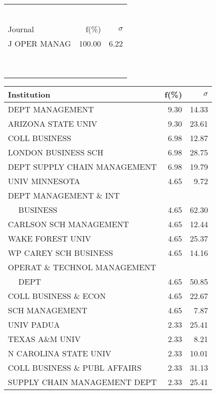\documentclass[a4paper,11pt]{report}
\begin{document}
\begin{landscape}
\begin{table}[!ht]
{\begin{tabular}{|l r  r|}
 &  & \\
 &  & \\
 &  & \\
 &  & \\
 &  & \\
 &  & \\
\hline
\hline
Journal & f(\%) & $\sigma$\\
\hline
J OPER MANAG & 100.00 & 6.22\\
 &  & \\
 &  & \\
 &  & \\
 &  & \\
 &  & \\
 &  & \\
 &  & \\
 &  & \\
 &  & \\
\hline
\end{tabular}
}
{\scriptsize\begin{tabular}{|l r r|}
\hline
Institution & f(\%) & $\sigma$\\
\hline
DEPT MANAGEMENT & 9.30 & 14.33\\
ARIZONA STATE UNIV & 9.30 & 23.61\\
COLL BUSINESS & 6.98 & 12.87\\
LONDON BUSINESS SCH & 6.98 & 28.75\\
DEPT SUPPLY CHAIN MANAGEMENT & 6.98 & 19.79\\
UNIV MINNESOTA & 4.65 & 9.72\\
DEPT MANAGEMENT \& INT &  & \\
$\quad$ BUSINESS & 4.65 & 62.30\\
CARLSON SCH MANAGEMENT & 4.65 & 12.44\\
WAKE FOREST UNIV & 4.65 & 25.37\\
WP CAREY SCH BUSINESS & 4.65 & 14.16\\
OPERAT \& TECHNOL MANAGEMENT &  & \\
$\quad$ DEPT & 4.65 & 50.85\\
COLL BUSINESS \& ECON & 4.65 & 22.67\\
SCH MANAGEMENT & 4.65 & 7.87\\
UNIV PADUA & 2.33 & 25.41\\
TEXAS A\&M UNIV & 2.33 & 8.21\\
N CAROLINA STATE UNIV & 2.33 & 10.01\\
COLL BUSINESS \& PUBL AFFAIRS & 2.33 & 31.13\\
SUPPLY CHAIN MANAGEMENT DEPT & 2.33 & 25.41\\

\end{tabular}}
\end{table}
\end{landscape}
\end{document}
